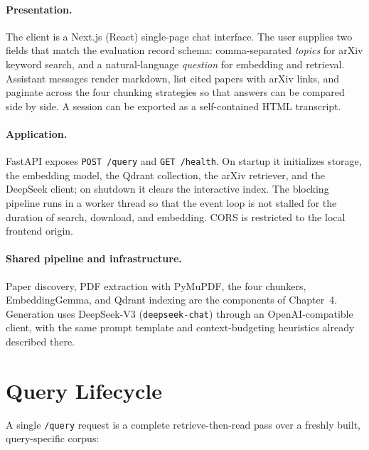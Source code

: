 \documentclass[12pt,a4paper,titlepage,oneside]{book}
\begin{document}
\paragraph{Presentation.} The client is a Next.js (React) single-page chat interface. The user supplies two fields that match the evaluation record schema: comma-separated \emph{topics} for arXiv keyword search, and a natural-language \emph{question} for embedding and retrieval. Assistant messages render markdown, list cited papers with arXiv links, and paginate across the four chunking strategies so that answers can be compared side by side. A session can be exported as a self-contained HTML transcript.

\paragraph{Application.} FastAPI exposes \texttt{POST /query} and \texttt{GET /health}. On startup it initializes storage, the embedding model, the Qdrant collection, the arXiv retriever, and the DeepSeek client; on shutdown it clears the interactive index. The blocking pipeline runs in a worker thread so that the event loop is not stalled for the duration of search, download, and embedding. CORS is restricted to the local frontend origin.

\paragraph{Shared pipeline and infrastructure.} Paper discovery, PDF extraction with PyMuPDF, the four chunkers, EmbeddingGemma, and Qdrant indexing are the components of Chapter~4. Generation uses DeepSeek-V3 (\texttt{deepseek-chat}) through an OpenAI-compatible client, with the same prompt template and context-budgeting heuristics already described there.

\section{Query Lifecycle}

A single \texttt{/query} request is a complete retrieve-then-read pass over a freshly built, query-specific corpus:
\end{document}

